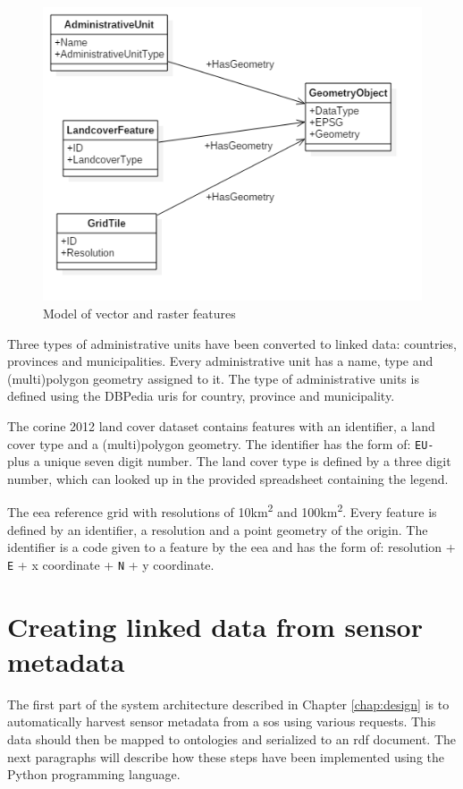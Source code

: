 \begin{figure}
	\includegraphics[width=0.7\linewidth]{UML/staticdata2.PNG}
	\caption{Model of vector and raster features}
	\label{fig:Static}
\end{figure}

Three types of administrative units have been converted to linked data: countries, provinces and municipalities. Every administrative unit has a name, type and (multi)polygon geometry assigned to it. The type of administrative units is defined using the DBPedia \ac{uri}s for country, province and municipality. 

The \ac{corine} 2012 land cover dataset contains features with an identifier, a land cover type and a (multi)polygon geometry. The identifier has the form of: \texttt{EU-} plus a unique seven digit number. The land cover type is defined by a three digit number, which can looked up in the provided spreadsheet containing the legend.    

The \ac{eea} reference grid with resolutions of 10km\textsuperscript{2} and 100km\textsuperscript{2}. Every feature is defined by an identifier, a resolution and a point geometry of the origin. The identifier is a code given to a feature by the \ac{eea} and has the form of: resolution + \texttt{E} + x coordinate + \texttt{N} + y coordinate.  


\section{Creating linked data from sensor metadata}
\label{par:linkedSD}
The first part of the system architecture described in Chapter \ref{chap:design} is to automatically harvest sensor metadata from a \ac{sos} using various requests. This data should then be mapped to ontologies and serialized to an \ac{rdf} document. The next paragraphs will describe how these steps have been implemented using the Python programming language.

